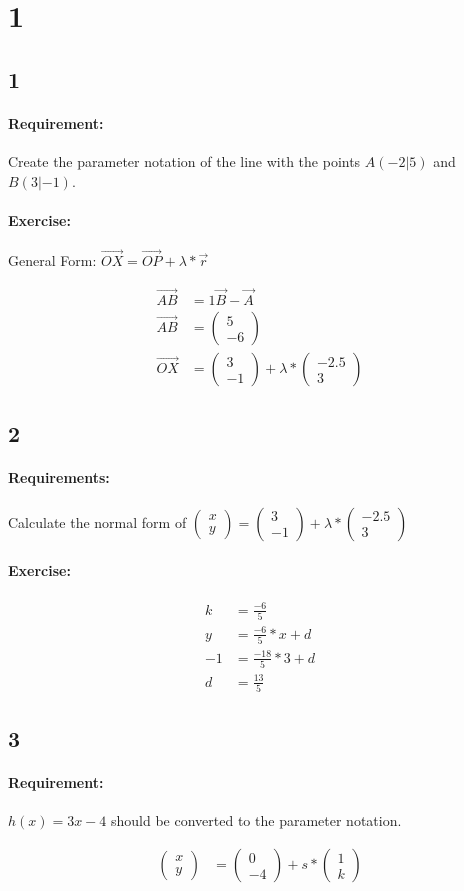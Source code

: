 \documentclass{article}
\newcommand{\vectorTwo}[2]{\begin{pmatrix}
    #1 \\ 
    #2
\end{pmatrix}}
\begin{document}
\section{1}

\subsection{1}

\paragraph{Requirement:}

Create the parameter notation of the line with the points $A(-2|5)$ and $B(3|-1)$.

\paragraph{Exercise:}

General Form: $\vec{OX} = \vec{OP} + \lambda * \vec{r}$

\begin{align}
    \vec{AB} &= 1 \vec{B} - \vec{A} \\
    \vec{AB} &= \begin{pmatrix}
        5 \\ 
        -6
    \end{pmatrix} \\[10pt]
    \vec{OX} &= \vectorTwo{3}{-1} + \lambda * \vectorTwo{-2.5}{3}
\end{align}

\subsection{2}

\paragraph{Requirements:}

Calculate the normal form of $\vectorTwo{x}{y} = \vectorTwo{3}{-1} + \lambda * \vectorTwo{-2.5}{3}$

\paragraph{Exercise:}

\begin{align}
    k &= \frac{-6}{5} \\[20pt]
    y &= \frac{-6}{5} * x + d \\
    -1 &= \frac{-18}{5} * 3 + d \\
    d &= \frac{13}{5}
\end{align}

\subsection{3}

\paragraph{Requirement:}
$h(x) = 3x - 4$ should be converted to the parameter notation.

\begin{align}
    \vectorTwo{x}{y} &= \vectorTwo{0}{-4} + s * \vectorTwo{1}{k}
\end{align}
\end{document}

